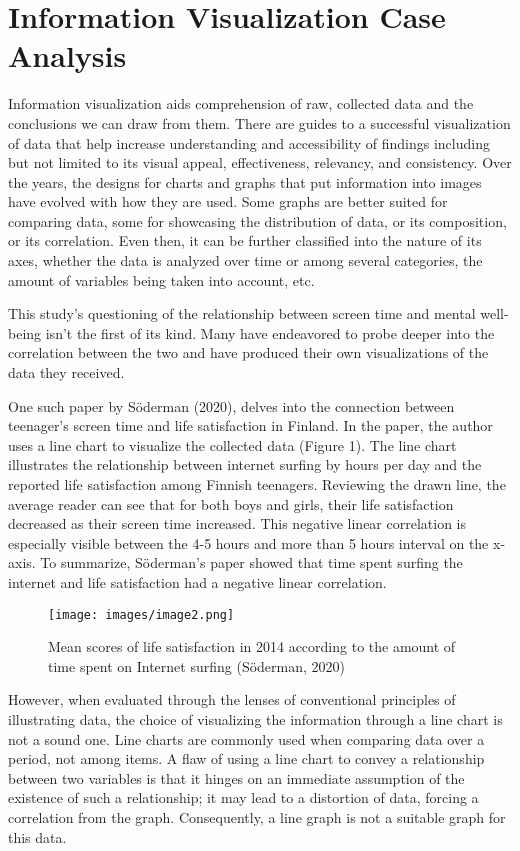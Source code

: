 \documentclass[12pt, a4paper]{article}
\begin{document}
\section{Information Visualization Case Analysis}

\par Information visualization aids comprehension of raw, collected data and the conclusions we can draw from them. There are guides to a successful visualization of data that help increase understanding and accessibility of findings including but not limited to its visual appeal, effectiveness, relevancy, and consistency. Over the years, the designs for charts and graphs that put information into images have evolved with how they are used. Some graphs are better suited for comparing data, some for showcasing the distribution of data, or its composition, or its correlation. Even then, it can be further classified into the nature of its axes, whether the data is analyzed over time or among several categories, the amount of variables being taken into account, etc.
\par This study’s questioning of the relationship between screen time and mental well-being isn’t the first of its kind. Many have endeavored to probe deeper into the correlation between the two and have produced their own visualizations of the data they received.
\par One such paper by Söderman (2020), delves into the connection between teenager’s screen time and life satisfaction in Finland. In the paper, the author uses a line chart to visualize the collected data (Figure 1). The line chart illustrates the relationship between internet surfing by hours per day and the reported life satisfaction among Finnish teenagers. Reviewing the drawn line, the average reader can see that for both boys and girls, their life satisfaction decreased as their screen time increased. This negative linear correlation is especially visible between the 4-5 hours and more than 5 hours interval on the x-axis. To summarize, Söderman’s paper showed that time spent surfing the internet and life satisfaction had a negative linear correlation.
\begin{figure}[h]
    \centering
    \texttt{[image: images/image2.png]}
    \caption{Mean scores of life satisfaction in 2014 according to the amount of time spent on Internet surfing (Söderman, 2020)}
    \label{fig:line_chart}
\end{figure}
\par However, when evaluated through the lenses of conventional principles of illustrating data, the choice of visualizing the information through a line chart is not a sound one. Line charts are commonly used when comparing data over a period, not among items. A flaw of using a line chart to convey a relationship between two variables is that it hinges on an immediate assumption of the existence of such a relationship; it may lead to a distortion of data, forcing a correlation from the graph. Consequently, a line graph is not a suitable graph for this data.
\end{document}
